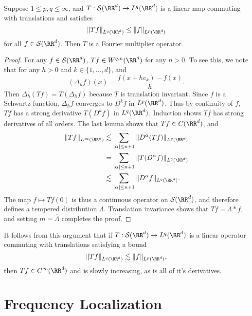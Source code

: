 \begin{theorem}
  Suppose $1 \leq p,q \leq \infty$, and $T: \mathcal{S}(\RR^d) \to L^q(\RR^d)$ is a linear map commuting with translations and satisfies
  \[ \| Tf \|_{L^q(\RR^d)} \leq \| f \|_{L^p(\RR^d)} \]
  for all $f \in \mathcal{S}(\RR^d)$. Then $T$ is a Fourier multiplier operator.
\end{theorem}
\begin{proof}
  For any $f \in \mathcal{S}(\RR^d)$, $Tf \in W^{q,n}(\RR^d)$ for any $n > 0$. To see this, we note that for any $h > 0$ and $k \in \{ 1, \dots, d \}$, and
  \[ (\Delta_h f)(x) = \frac{f(x + he_k) - f(x)}{h}. \]
  Then $\Delta_h(T f) = T(\Delta_h f)$ because $T$ is translation invariant. Since $f$ is a Schwartz function, $\Delta_h f$ converges to $D^k f$ in $L^p(\RR^d)$. Thus by continuity of $f$, $Tf$ has a strong derivative $T(D^k f)$ in $L^q(\RR^d)$. Induction shows $Tf$ has strong derivatives of all orders. The last lemma shows that $Tf \in C(\RR^d)$, and
  \begin{align*}
    \| Tf \|_{L^\infty(\RR^d)} &\lesssim \sum_{|\alpha| \leq n+1} \| D^\alpha(Tf) \|_{L^q(\RR^d)}\\
    &= \sum_{|\alpha| \leq n+1} \| T(D^\alpha f) \|_{L^q(\RR^d)}\\
    &\lesssim \sum_{|\alpha| \leq n+1} \| D^\alpha f \|_{L^q(\RR^d)}.
  \end{align*}
  The map $f \mapsto Tf(0)$ is thus a continuous operator on $\mathcal{S}(\RR^d)$, and therefore defines a tempered distribution $\Lambda$. Translation invariance shows that $Tf = \Lambda * f$, and setting $m = \widehat{\Lambda}$ completes the proof.
\end{proof}

\begin{remark}
    It follows from this argument that if $T: \mathcal{S}(\RR^d) \to L^q(\RR^d)$ is a linear operator commuting with translations satisfying a bound
    \[ \| Tf \|_{L^q(\RR^d)} \lesssim \| f \|_{L^p(\RR^d)}, \]
    then $Tf \in C^\infty(\RR^d)$ and is slowly increasing, as is all of it's derivatives.
\end{remark}







\section{Frequency Localization}

